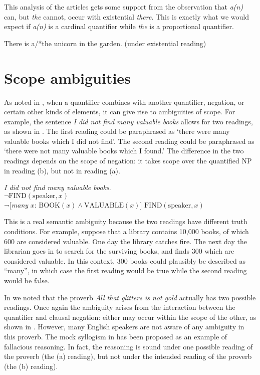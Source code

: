 This analysis of the articles gets some support from the observation that \textit{a(n)} can, but \textit{the} cannot, occur with existential \textit{there}. This is exactly what we would expect if \textit{a(n)} is a cardinal quantifier while \textit{the} is a proportional quantifier.


\ea \label{ex:14.30}
  There is a/*the unicorn in the garden.  (under existential reading)
\z

\section{Scope ambiguities}\label{sec:14.5}

As noted in , when a quantifier combines with another quantifier, negation, or certain other kinds of elements, it can give rise to ambiguities of scope. For example, the sentence \textit{I did not find many valuable books} allows for two readings, as shown in . The first reading could be paraphrased as ‘there were many valuable books which I did not find’. The second reading could be paraphrased as ‘there were not many valuable books which I found.’ The difference in the two readings depends on the scope of negation: it takes scope over the quantified NP in reading (b), but not in reading (a).


\ea \label{ex:14.31}
\textit{I did not find many valuable books}.\\
\ea {} $\neg \text{FIND}(\text{speaker},x)$\\
\ex  ¬[\textit{many} $x$: $\text{BOOK}(x) \wedge \text{VALUABLE}(x)$] $\text{FIND}(\text{speaker},x)$
   \z
\z


This is a real semantic ambiguity because the two readings have different truth conditions. For example, suppose that a library contains 10,000 books, of which 600 are considered valuable. One day the library catches fire. The next day the librarian goes in to search for the surviving books, and finds 300 which are considered valuable. In this context, 300 books could plausibly be described as “many”, in which case the first reading would be true while the second reading would be false.



In  we noted that the proverb \textit{All that glitters is not gold} actually has two possible readings. Once again the ambiguity arises from the interaction between the quantifier and clausal negation: either may occur within the scope of the other, as shown in . However, many English speakers are not aware of any ambiguity in this proverb. The mock syllogism in  has been proposed as an example of fallacious reasoning. In fact, the reasoning is sound under one possible reading of the proverb (the (a) reading), but not under the intended reading of the proverb (the (b) reading).


